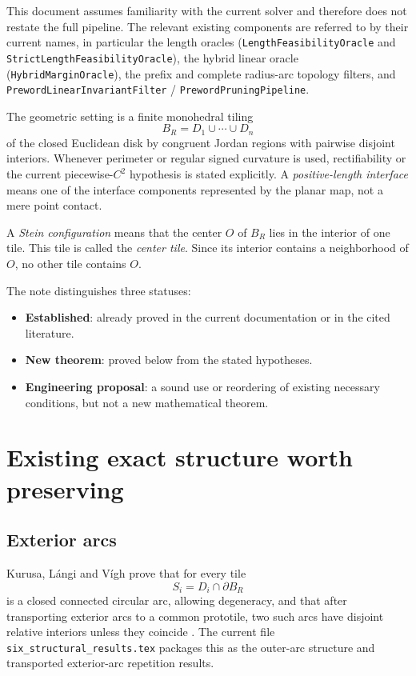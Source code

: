\documentclass[11pt]{article}
\theoremstyle{definition}
\theoremstyle{remark}
\newcommand{\BR}{B_R}
\begin{document}
This document assumes familiarity with the current solver and therefore does not restate the full pipeline.  The relevant existing components are referred to by their current names, in particular the length oracles (\texttt{LengthFeasibilityOracle} and
\texttt{StrictLengthFeasibilityOracle}), the hybrid linear oracle
(\texttt{HybridMarginOracle}), the prefix and complete radius-arc topology
filters, and \texttt{PrewordLinearInvariantFilter} / \texttt{PrewordPruningPipeline}.

The geometric setting is a finite monohedral tiling
\[
  \BR=D_1\cup\cdots\cup D_n
\]
of the closed Euclidean disk by congruent Jordan regions with pairwise disjoint interiors.  Whenever perimeter or regular signed curvature is used, rectifiability or the current piecewise-$C^2$ hypothesis is stated explicitly.  A \emph{positive-length interface} means one of the interface components represented by the planar map, not a mere point contact.

A \emph{Stein configuration} means that the center $O$ of \(\BR\) lies in the interior of one tile.  This tile is called the \emph{center tile}.  Since its interior contains a neighborhood of $O$, no other tile contains $O$.

The note distinguishes three statuses:
\begin{itemize}
\item \textbf{Established}: already proved in the current documentation or in the cited literature.
\item \textbf{New theorem}: proved below from the stated hypotheses.
\item \textbf{Engineering proposal}: a sound use or reordering of existing necessary conditions, but not a new mathematical theorem.
\end{itemize}

\section{Existing exact structure worth preserving}

\subsection{Exterior arcs}

Kurusa, L\'angi and V\'igh prove that for every tile
\[
  S_i=D_i\cap\partial\BR
\]
is a closed connected circular arc, allowing degeneracy, and that after transporting exterior arcs to a common prototile, two such arcs have disjoint relative interiors unless they coincide \cite{KLV2020}.  The current file \texttt{six\_structural\_results.tex} packages this as the outer-arc structure and transported exterior-arc repetition results.
\end{document}
